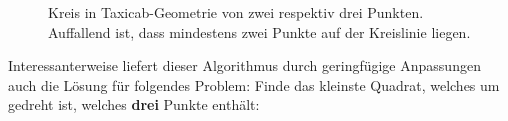 \documentclass{article}
\begin{document}
\begin{figure}[htb]
  \centering
  \qquad
  \qquad
  \caption{Kreis in Taxicab-Geometrie von zwei respektiv drei Punkten. Auffallend ist, dass mindestens
  zwei Punkte auf der Kreislinie liegen.}
  \label{fig:taxicab_calc}
\end{figure}

Interessanterweise liefert dieser Algorithmus durch geringfügige Anpassungen auch die Lösung für folgendes Problem:
Finde das kleinste Quadrat, welches um \unit[45]{\textdegree} gedreht ist, welches \textbf{drei} Punkte enthält:
\end{document}
